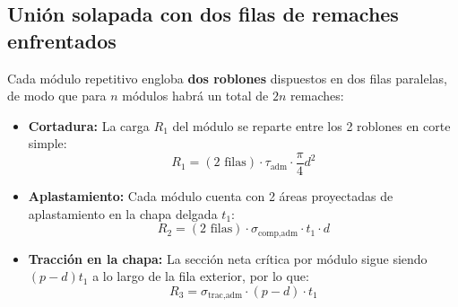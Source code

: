 \subsection{Unión solapada con dos filas de remaches enfrentados}
Cada módulo repetitivo engloba \textbf{dos roblones} dispuestos en dos filas paralelas, de modo que para $n$ módulos habrá un total de $2n$ remaches:
\begin{itemize}
    \item \textbf{Cortadura:} La carga $R_1$ del módulo se reparte entre los 2 roblones en corte simple:
          \begin{equation*}
              R_1 = (2\text{ filas}) \cdot \tau_{\text{adm}} \cdot \frac{\pi}{4}d^2
          \end{equation*}
    \item \textbf{Aplastamiento:} Cada módulo cuenta con 2 áreas proyectadas de aplastamiento en la chapa delgada $t_1$:
          \begin{equation*}
              R_2 = (2\text{ filas}) \cdot \sigma_{\text{comp,adm}} \cdot t_1 \cdot d
          \end{equation*}
    \item \textbf{Tracción en la chapa:} La sección neta crítica por módulo sigue siendo $(p - d)t_1$ a lo largo de la fila exterior, por lo que:
          \begin{equation*}
              R_3 = \sigma_{\text{trac,adm}} \cdot (p - d) \cdot t_1
          \end{equation*}
\end{itemize}

